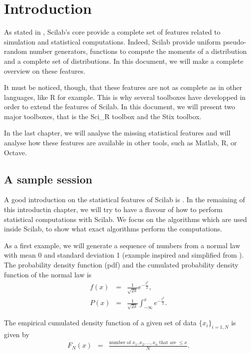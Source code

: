 \chapter{Introduction}

As stated in \cite{scilabstats2001}, Scilab's core provide
a complete set of features related to simulation and statistical
computations.
Indeed, Scilab provide uniform pseudo-random number generators, functions to 
compute the moments of a distribution and a complete set of 
distributions. In this document, we will make a complete 
overview on these features.

It must be noticed, though, that these features
are not as complete as in other languages, like R for example.
This is why several toolboxes have developped in order to extend 
the features of Scilab. In this document, we will present two
major toolboxes, that is the Sci\_R toolbox and the Stix toolbox.

In the last chapter, we will analyse the missing statistical 
features and will analyse how these features are available in other
tools, such as Matlab, R, or Octave.

\section{A sample session}

A good introduction on the statistical features of Scilab is \cite{scilabintro2007}.
In the remaining of this introductin chapter, we will try to have 
a flavour of how to perform statistical computations with Scilab.
We focus on the algorithms which are used inside Scilab, to show what 
exact algorithms perform the computations.

As a first example, we will generate a sequence of numbers from a 
normal law with mean 0 and standard deviation 1 (example inspired and simplified 
from \cite{scilabintro2007}). The probability density function (pdf) 
and the cumulated probability density function of the normal law is 
\begin{eqnarray}
f(x) &=& \frac{1}{\sqrt{2\pi}} e^{-\frac{t^2}{2}},\\
P(x) &=& \frac{1}{\sqrt{2\pi}} \int_{-\infty}^x e^{-\frac{t^2}{2}}.
\end{eqnarray}

The empirical cumulated density function \cite{artcomputerKnuthVol2} of a given
set of data $\{x_i\}_{i=1,N}$ is given by 
\begin{eqnarray}
F_N(x) &=& \frac{\textrm{number of } x_1,x_2,\ldots,x_n \textrm{ that are }\leq x}{N}.
\end{eqnarray}


